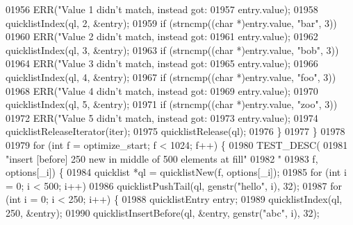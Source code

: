 \begin{DoxyCode}
{{{{{{{{{{{{{{{{{{{{{{{{{{{{{{{{{{{{{{{{{{{{{{{{{{{{01956                     ERR(\textcolor{stringliteral}{"Value 1 didn't match, instead got: %
01957                         entry.value);
01958                 quicklistIndex(ql, 2, &entry);
01959                 \textcolor{keywordflow}{if} (strncmp((\textcolor{keywordtype}{char} *)entry.value, \textcolor{stringliteral}{"bar"}, 3))
01960                     ERR(\textcolor{stringliteral}{"Value 2 didn't match, instead got: %
01961                         entry.value);
01962                 quicklistIndex(ql, 3, &entry);
01963                 \textcolor{keywordflow}{if} (strncmp((\textcolor{keywordtype}{char} *)entry.value, \textcolor{stringliteral}{"bob"}, 3))
01964                     ERR(\textcolor{stringliteral}{"Value 3 didn't match, instead got: %
01965                         entry.value);
01966                 quicklistIndex(ql, 4, &entry);
01967                 \textcolor{keywordflow}{if} (strncmp((\textcolor{keywordtype}{char} *)entry.value, \textcolor{stringliteral}{"foo"}, 3))
01968                     ERR(\textcolor{stringliteral}{"Value 4 didn't match, instead got: %
01969                         entry.value);
01970                 quicklistIndex(ql, 5, &entry);
01971                 \textcolor{keywordflow}{if} (strncmp((\textcolor{keywordtype}{char} *)entry.value, \textcolor{stringliteral}{"zoo"}, 3))
01972                     ERR(\textcolor{stringliteral}{"Value 5 didn't match, instead got: %
01973                         entry.value);
01974                 quicklistReleaseIterator(iter);
01975                 quicklistRelease(ql);
01976             \}
01977         \}
01978 
01979         \textcolor{keywordflow}{for} (\textcolor{keywordtype}{int} f = optimize\_start; f < 1024; f++) \{
01980             TEST\_DESC(
01981                 \textcolor{stringliteral}{"insert [before] 250 new in middle of 500 elements at fill"}
01982                 \textcolor{stringliteral}{" %
01983                 f, options[\_i]) \{
01984                 quicklist *ql = quicklistNew(f, options[\_i]);
01985                 \textcolor{keywordflow}{for} (\textcolor{keywordtype}{int} i = 0; i < 500; i++)
01986                     quicklistPushTail(ql, genstr(\textcolor{stringliteral}{"hello"}, i), 32);
01987                 \textcolor{keywordflow}{for} (\textcolor{keywordtype}{int} i = 0; i < 250; i++) \{
01988                     quicklistEntry entry;
01989                     quicklistIndex(ql, 250, &entry);
01990                     quicklistInsertBefore(ql, &entry, genstr(\textcolor{stringliteral}{"abc"}, i), 32);
}}}}}}}}}}}}}}}}}}}}}}}}}}}}}}}}}}}}}}}}}}}}}}}}}}}}}}}}}}
\end{DoxyCode}
